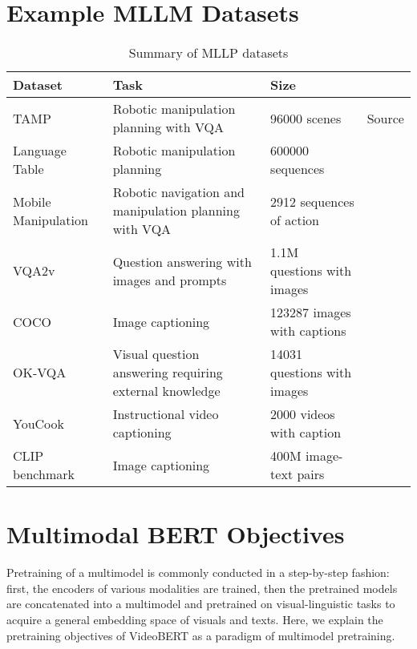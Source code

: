 \documentclass[11pt]{article}
\begin{document}
\appendix

\section{Example MLLM Datasets}

\begin{table}[H]
    \centering
    \small
    \begin{tabular}{l|l|l|l|}
        \hline
        Dataset & Task & Size \\
        \hline
        TAMP & Robotic manipulation planning with VQA & 96000 scenes & Source\\
        Language Table & Robotic manipulation planning & 600000 sequences & \citet{DBLP:conf/icml/DriessXSLCIWTVY23}\\
        Mobile Manipulation & Robotic navigation and manipulation planning with VQA & 2912 sequences of action & \citet{DBLP:conf/icml/DriessXSLCIWTVY23}\\
        VQA2v & Question answering with images and prompts & 1.1M questions with images &\citet{DBLP:journals/ijcv/GoyalKASBP19}\\
        COCO & Image captioning & 123287 images with captions & \citet{DBLP:journals/corr/ChenFLVGDZ15}\\
        OK-VQA & Visual question answering requiring external knowledge & 14031 questions with images &\citet{DBLP:conf/cvpr/MarinoRFM19}\\
        YouCook & Instructional video captioning & 2000 videos with caption & \citet{DBLP:conf/iccv/SunMV0S19}\\
        CLIP benchmark & Image captioning & 400M image-text pairs & \citet{DBLP:conf/icml/RadfordKHRGASAM21}\\
        \hline
    \end{tabular}
    \caption{Summary of MLLP datasets}
    \onecolumn
\end{table}

\twocolumn
\section{Multimodal BERT Objectives}
\label{sec:appendix}
Pretraining of a multimodel is commonly conducted in a step-by-step fashion: first, the encoders of various modalities are trained, then the pretrained models are concatenated into a multimodel and pretrained on visual-linguistic tasks to acquire a general embedding space of visuals and texts. Here, we explain the pretraining objectives of VideoBERT \citep{DBLP:conf/iccv/SunMV0S19} as a paradigm of multimodel pretraining. 
\end{document}
